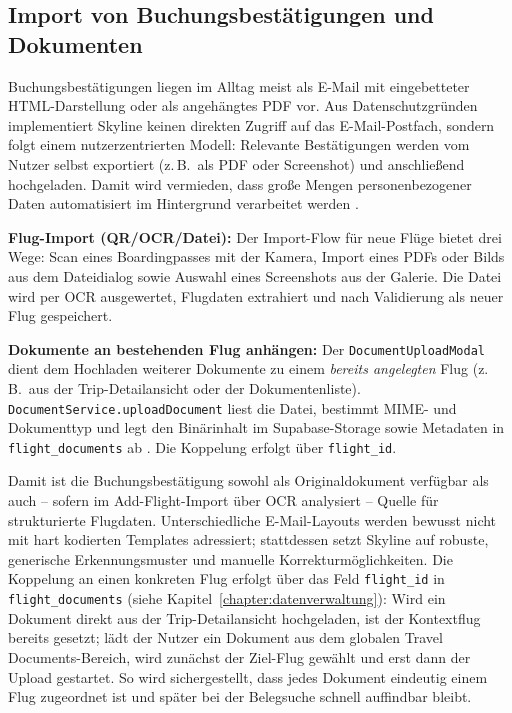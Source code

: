\subsection{Import von Buchungsbestätigungen und Dokumenten}

Buchungsbestätigungen liegen im Alltag meist als E-Mail mit eingebetteter HTML-Darstellung oder als angehängtes PDF vor.
Aus Datenschutzgründen implementiert Skyline keinen direkten Zugriff auf das E-Mail-Postfach, sondern folgt einem nutzerzentrierten Modell:
Relevante Bestätigungen werden vom Nutzer selbst exportiert (z.\,B.\ als PDF oder Screenshot) und anschließend hochgeladen.
Damit wird vermieden, dass große Mengen personenbezogener Daten automatisiert im Hintergrund verarbeitet werden \cite{gdpr,edpbArt25}.

\textbf{Flug-Import (QR/OCR/Datei):} Der Import-Flow für neue Flüge bietet drei Wege: Scan eines Boardingpasses mit der Kamera, Import eines PDFs oder Bilds aus dem Dateidialog sowie Auswahl eines Screenshots aus der Galerie. Die Datei wird per OCR ausgewertet, Flugdaten extrahiert und nach Validierung als neuer Flug gespeichert.

\textbf{Dokumente an bestehenden Flug anhängen:} Der \texttt{DocumentUploadModal} dient dem Hochladen weiterer Dokumente zu einem \emph{bereits angelegten} Flug (z.\,B.\ aus der Trip-Detailansicht oder der Dokumentenliste). \texttt{DocumentService.uploadDocument} liest die Datei, bestimmt MIME- und Dokumenttyp und legt den Binärinhalt im Supabase-Storage sowie Metadaten in \texttt{flight\_documents} ab \cite{supabaseStorage}. Die Koppelung erfolgt über \texttt{flight\_id}.

Damit ist die Buchungsbestätigung sowohl als Originaldokument verfügbar als auch -- sofern im Add-Flight-Import über OCR analysiert -- Quelle für strukturierte Flugdaten.
Unterschiedliche E-Mail-Layouts werden bewusst nicht mit hart kodierten Templates adressiert; stattdessen setzt Skyline auf robuste, generische Erkennungsmuster und manuelle Korrekturmöglichkeiten.
Die Koppelung an einen konkreten Flug erfolgt über das Feld \texttt{flight\_id} in \texttt{flight\_documents} (siehe Kapitel~\ref{chapter:datenverwaltung}):
Wird ein Dokument direkt aus der Trip-Detailansicht hochgeladen, ist der Kontextflug bereits gesetzt; lädt der Nutzer ein Dokument aus dem globalen \glqq Travel Documents\grqq{}-Bereich, wird zunächst der Ziel-Flug gewählt und erst dann der Upload gestartet.
So wird sichergestellt, dass jedes Dokument eindeutig einem Flug zugeordnet ist und später bei der Belegsuche schnell auffindbar bleibt.

